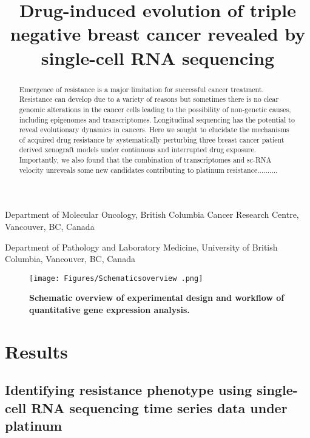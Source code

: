 \documentclass{nature}
\title{Drug-induced evolution of triple negative breast cancer revealed by single-cell RNA sequencing}
\author{Farhia Kabeer*$^{1,2}$, Hoa Tran*$^{1,2}$, Mirela Andronescu*$^{1,2}$,
   Nicholas Ceglia$^{1,2}$, 
   Hakwoo Lee$^{1,2}$, 
   Sohrab Salehi$^{1,2}$,
	Marc Williams$^{1,2}$
	Beixi Wang$^{1,2}$
	Justina Biele$^{1,2}$
	Jazmine Brimhall$^{1,2}$
	David Gee$^{1,2}$
	Ciara O’Flanagan$^{1,2}$,
	Teresa Ruiz de Algara$^{1,2}$,
	Peter Eirew$^{1,2}$,
	Takako Kono$^{1,2}$,
	Jennifer Pham$^{1,2}$,
	Daniel Lai$^{1,2}$,
	Richard Moore$^{1,2}$,
	Andrew J. Mungall$^{1,2}$,
	Marco A. Marra$^{1,2}$,
	IMAXT Consortium$^{1,2}$,
	Andrew McPherson$^{1,2}$,
	Andrew Roth$^{\dagger}$^{1,2}$,
	Kieran R. Campbell{\dagger}$^{1,2}$
	Sohrab P Shah$^{\dagger}$^{1,2}$,
    Samuel Aparicio$^{\dagger}$^{1,2}$}
\begin{document}
  \maketitle
\begin{affiliations}
 \item Department of Molecular Oncology, British Columbia Cancer Research Centre, Vancouver, BC, Canada
 \item Department of Pathology and Laboratory Medicine, University of British Columbia, Vancouver, BC, Canada 
\end{affiliations}

\newline

\begin{abstract}
Emergence of resistance is a major limitation for successful cancer treatment. Resistance can develop due to a variety of reasons but sometimes there is no clear genomic alterations in the cancer cells leading to the possibility of non-genetic causes, including epigenomes and transcriptomes. Longitudinal sequencing has the potential to reveal evolutionary dynamics in cancers. Here we sought to elucidate the mechanisms of acquired drug resistance by systematically perturbing three breast cancer patient derived xenograft models under continuous and interrupted drug exposure. Importantly, we also found that the combination of transcriptomes and sc-RNA velocity unreveals some new  candidates contributing to platinum resistance..........
 
 
\end{abstract}



\begin{figure}
	\centering
	\texttt{[image: Figures/Schematicsoverview .png]}
	\caption[Establishment of]
	{\small
	    \textbf{Schematic overview of experimental design and workflow of quantitative gene expression analysis. 
} 
	}
	\label{fig:Schematicsoverview}
\end{figure}


\section*{Results}

\subsection{Identifying resistance phenotype using single-cell RNA sequencing time series data under platinum}
\end{document}
